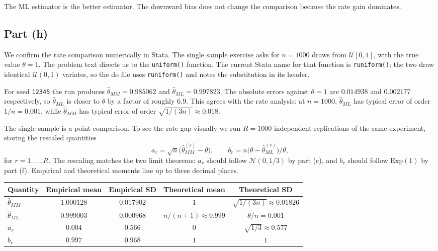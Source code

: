 The ML estimator is the better estimator. The downward bias does not change the comparison because the rate gain dominates.

\subsection*{Part (h)}

We confirm the rate comparison numerically in Stata. The single sample exercise asks for $n = 1000$ draws from $\mathcal{U}[0, 1]$, with the true value $\theta = 1$. The problem text directs us to the \texttt{uniform()} function. The current Stata name for that function is \texttt{runiform()}; the two draw identical $\mathcal{U}(0, 1)$ variates, so the do file uses \texttt{runiform()} and notes the substitution in its header.

For seed \texttt{12345} the run produces $\widehat\theta_{MM} = 0.985062$ and $\widehat\theta_{ML} = 0.997823$. The absolute errors against $\theta = 1$ are $0.014938$ and $0.002177$ respectively, so $\widehat\theta_{ML}$ is closer to $\theta$ by a factor of roughly $6.9$. This agrees with the rate analysis: at $n = 1000$, $\widehat\theta_{ML}$ has typical error of order $1/n = 0.001$, while $\widehat\theta_{MM}$ has typical error of order $\sqrt{1/(3n)} \approx 0.018$.

The single sample is a point comparison. To see the rate gap visually we run $R = 1000$ independent replications of the same experiment, storing the rescaled quantities
\[
a_r = \sqrt n \bigl(\widehat\theta_{MM}^{(r)} - \theta\bigr), \qquad
b_r = n \bigl(\theta - \widehat\theta_{ML}^{(r)}\bigr)/\theta,
\]
for $r = 1, \dots, R$. The rescaling matches the two limit theorems: $a_r$ should follow $\mathcal{N}(0, 1/3)$ by part (c), and $b_r$ should follow $\mathrm{Exp}(1)$ by part (f). Empirical and theoretical moments line up to three decimal places.

\begin{center}
\begin{tabular}{lcccc}
\toprule
Quantity & Empirical mean & Empirical SD & Theoretical mean & Theoretical SD \\
\midrule
$\widehat\theta_{MM}$ & $1.000128$ & $0.017902$ & $1$ & $\sqrt{1/(3n)} \approx 0.01826$ \\
$\widehat\theta_{ML}$ & $0.999003$ & $0.000968$ & $n/(n+1) \approx 0.999$ & $\theta/n = 0.001$ \\
$a_r$ & $0.004$ & $0.566$ & $0$ & $\sqrt{1/3} \approx 0.577$ \\
$b_r$ & $0.997$ & $0.968$ & $1$ & $1$ \\
\bottomrule
\end{tabular}
\end{center}


